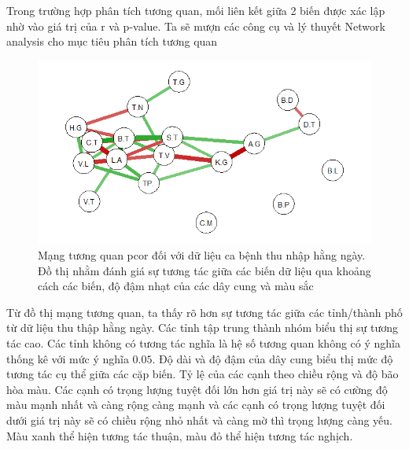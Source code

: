 \documentclass[../thesis.tex]{subfiles}
\begin{document}
\newpage

Trong trường hợp phân tích tương quan, mối liên kết giữa 2 biến được xác lập nhờ vào giá trị của r và p-value. Ta sẽ mượn các công cụ và lý thuyết Network analysis cho mục tiêu phân tích tương quan
 \begin{Shaded}
	\begin{Highlighting}[]
\OtherTok{\textless{}{-}}\SpecialCharTok{\%\textgreater{}\%} \NormalTok{() }\SpecialCharTok{\%\textgreater{}\%} 
\SpecialCharTok{::}
		 \NormalTok{, }
		 \NormalTok{, }
		 \NormalTok{,}
		 
		 \NormalTok{)}
	\end{Highlighting}
\end{Shaded}

\begin{figure}[H]
	\centering
	\includegraphics[width=0.7\linewidth]{images/net_case_05}
	\caption[Mạng tương quan pcor đối với dữ liệu ca bệnh thu nhập hằng ngày]{Mạng tương quan pcor đối với dữ liệu ca bệnh thu nhập hằng ngày. Đồ thị nhằm đánh giá sự tương tác giữa các biến dữ liệu qua khoảng cách các biến, độ đậm nhạt của các dây cung và màu sắc}
	\label{fig:netcase05}
\end{figure}

Từ đồ thị mạng tương quan, ta thấy rõ hơn sự tương tác giữa các tỉnh/thành phố từ dữ liệu thu thập hằng ngày. Các tỉnh tập trung thành nhóm biểu thị sự tương tác cao. Các tỉnh không có tương tác nghĩa là hệ số tương quan không có ý nghĩa thống kê với mức ý nghĩa $ 0.05 $. Độ dài và độ đậm của dây cung biểu thị mức độ tương tác cụ thể giữa các cặp biến. Tỷ lệ của các cạnh theo chiều rộng và độ bão hòa màu. Các cạnh có trọng lượng tuyệt đối lớn hơn giá trị này sẽ có cường độ màu mạnh nhất và càng rộng càng mạnh và các cạnh có trọng lượng tuyệt đối dưới giá trị này sẽ có chiều rộng nhỏ nhất và càng mờ thì trọng lượng càng yếu. Màu xanh thể hiện tương tác thuận, màu đỏ thể hiện tương tác nghịch.
\end{document}
